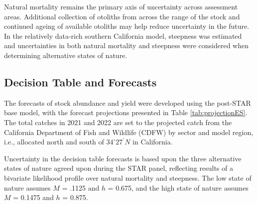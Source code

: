 \documentclass[11pt,
  english,
]{article}
\begin{document}
Natural mortality remains the primary axis of uncertainty across assessment areas. Additional collection of otoliths from across the range of the stock and continued ageing of available otoliths may help reduce uncertainty in the future. In the relatively data-rich southern California model, steepness was estimated and uncertainties in both natural mortality and steepness were considered when determining alternative states of nature.

\FloatBarrier


\hypertarget{decision-table-and-forecasts}{%
\subsection*{Decision Table and Forecasts}\label{decision-table-and-forecasts}}

\leavevmode\tagmcend\tagstructend

The forecasts of stock abundance and yield were developed using the post-STAR base model, with the forecast projections presented in Table \ref{tab:projectionES}. The total catches in 2021 and 2022 are set to the projected catch from the California Department of Fish and Wildlife (CDFW) by sector and model region, i.e., allocated north and south of $34^\circ 27^\prime N$ in California.

Uncertainty in the decision table forecasts is based upon the three alternative states of nature agreed upon during the STAR panel, reflecting results of a bivariate likelihood profile over natural mortality and steepness. The low state of nature assumes {\(M\)\leavevmode\tagmcend\tagstructend} = .1125 and {\(h\)\leavevmode\tagmcend\tagstructend} = 0.675, and the high state of nature assumes {\(M\)\leavevmode\tagmcend\tagstructend} = 0.1475 and {\(h\)\leavevmode\tagmcend\tagstructend} = 0.875.
\end{document}
